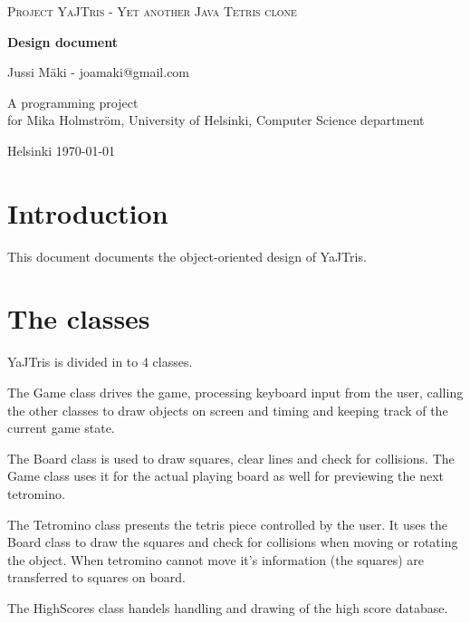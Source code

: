 \documentclass[11pt,a4paper]{article}
\begin{document}
\begin{titlepage}
  \begin{center} \sloppy
    \large \textsc{Project YaJTris - Yet another Java Tetris clone }
    \vfill

    \huge \textbf{Design document} \vfill 

    \LARGE Jussi Mäki - joamaki@gmail.com
    \vspace{3mm}
    
    A programming project\\
    for Mika Holmström, University of Helsinki, Computer Science department

    \vfill

    Helsinki \today

  \end{center}
\end{titlepage}

\section {Introduction}

This document documents the object-oriented design of YaJTris.

\section {The classes}

YaJTris is divided in to 4 classes. 

The Game class drives the game, processing keyboard input from the user, 
calling the other classes to draw objects on screen and timing and keeping track of the current game state.

The Board class is used to draw squares, clear lines and check for collisions. The Game class uses it for the actual
playing board as well for previewing the next tetromino.

The Tetromino class presents the tetris piece controlled by the user. It uses the Board class to draw the squares and 
check for collisions when moving or rotating the object. When tetromino cannot move it's information (the squares) are transferred to squares on board.

The HighScores class handels handling and drawing of the high score database.
\end{document}
